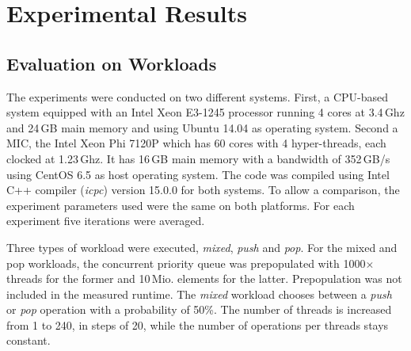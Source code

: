 \section{Experimental Results}
\label{sec:exp}
\subsection{Evaluation on Workloads}
The experiments were conducted on two different systems. First, a CPU-based system equipped with an Intel Xeon E3-1245 processor running 4 cores at 3.4\,Ghz and 24\,GB main memory and using Ubuntu 14.04 as operating system. Second a MIC, the Intel Xeon Phi 7120P which has 60 cores with 4 hyper-threads, each clocked at 1.23\,Ghz. It has 16\,GB main memory with a bandwidth of 352\,GB/s using CentOS 6.5 as host operating system. The code was compiled using Intel C++ compiler (\textit{icpc}) version 15.0.0 for both systems. To allow a comparison, the experiment parameters used were the same on both platforms. For each experiment five iterations were averaged. %

Three types of workload were executed, \textit{mixed}, \textit{push} and \textit{pop}. For the mixed and pop workloads, the concurrent priority queue was prepopulated with 1000$\times$threads for the former and 10\,Mio. elements for the latter. Prepopulation was not included in the measured runtime. The \textit{mixed} workload chooses between a \textit{push} or \textit{pop} operation with a probability of 50\%. The number of threads is increased from 1 to 240, in steps of 20, while the number of operations per threads stays constant.

